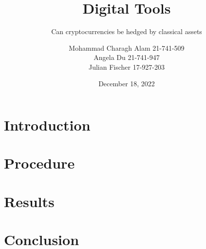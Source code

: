\documentclass{beamer}
\title[Cryptos vs. traditional assets]{Digital Tools}
\subtitle{Can cryptocurrencies be hedged by classical assets}
\author[Alam C M., Du A., Fischer J.]{Mohammad Charagh Alam 21-741-509\\Angela Du 21-741-947\\Julian Fischer 17-927-203}
\institute[UZH]{Faculty of Business, Economics and Informatics\\University of Zurich}
\date{December 18, 2022}
\begin{document}
\begin{frame}
\titlepage
\end{frame}


\section{Introduction}


\section{Procedure}


\section{Results}


\section{Conclusion}

\end{document}
